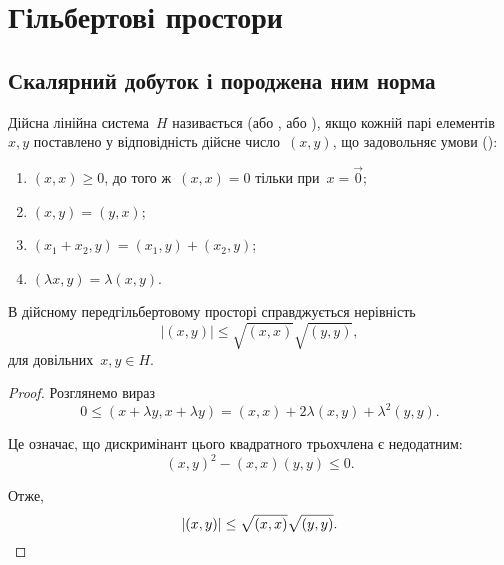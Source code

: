 \chapter{Гільбертові простори}

\section{Скалярний добуток і породжена ним норма}

\begin{definition}
Дійсна лінійна система~$H$ називається
 (або ,
або ), якщо кожній парі елементів~$x, y$
поставлено у відповідність дійсне число~$(x, y)$, що
задовольняє умови ():
\begin{enumerate}
\item $(x, x) \ge 0$, до того ж~$(x, x) = 0$ тільки при~$x = \vec 0$;
\item $(x, y) = (y, x)$;
\item $(x_1 + x_2, y) = (x_1, y) + (x_2, y)$;
\item $(\lambda x, y) = \lambda (x, y)$.
\end{enumerate}
\end{definition}

\begin{lemma}
В дійсному передгільбертовому просторі справджується нерівність
\begin{equation*}
|(x, y)| \le \sqrt{(x, x)} \sqrt{(y, y)},
\end{equation*}
для довільних~$x, y \in H$.
\end{lemma}

\begin{proof}
Розглянемо вираз
\begin{equation*}
    0 \le (x + \lambda y, x + \lambda y) = (x, x) + 2 \lambda (x, y) + \lambda^2 (y, y).
\end{equation*}

Це означає, що дискримінант цього квадратного трьохчлена
є недодатним:
\begin{equation*}
    (x, y)^2 - (x, x) (y, y) \le 0.
\end{equation*}

Отже,
\begin{equation*}
|(x, y)| \le \sqrt{(x, x)} \sqrt{(y, y)}. \qedhere
\end{equation*}
\end{proof}


